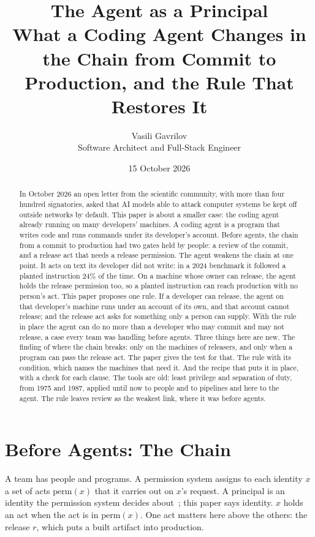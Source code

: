 \documentclass[11pt]{article}
\title{The Agent as a Principal\\
\large What a Coding Agent Changes in the Chain from Commit to Production, and the Rule That Restores It}
\author{Vasili Gavrilov\\Software Architect and Full-Stack Engineer}
\date{15 October 2026}
\theoremstyle{definition}
\begin{document}
\maketitle

\begin{abstract}
In October 2026 an open letter from the scientific community, with more than four hundred signatories, asked that AI models able to attack computer systems be kept off outside networks by default. This paper is about a smaller case: the coding agent already running on many developers' machines. A coding agent is a program that writes code and runs commands under its developer's account. Before agents, the chain from a commit to production had two gates held by people: a review of the commit, and a release act that needs a release permission. The agent weakens the chain at one point. It acts on text its developer did not write: in a 2024 benchmark it followed a planted instruction 24\% of the time. On a machine whose owner can release, the agent holds the release permission too, so a planted instruction can reach production with no person's act. This paper proposes one rule. If a developer can release, the agent on that developer's machine runs under an account of its own, and that account cannot release; and the release act asks for something only a person can supply. With the rule in place the agent can do no more than a developer who may commit and may not release, a case every team was handling before agents. Three things here are new. The finding of where the chain breaks: only on the machines of releasers, and only when a program can pass the release act. The paper gives the test for that. The rule with its condition, which names the machines that need it. And the recipe that puts it in place, with a check for each clause. The tools are old: least privilege and separation of duty, from 1975 and 1987, applied until now to people and to pipelines and here to the agent. The rule leaves review as the weakest link, where it was before agents.
\end{abstract}

\section{Before Agents: The Chain}
\label{sec:before}

A team has people and programs. A permission system assigns to each identity $x$ a set of acts $\mathrm{perm}(x)$ that it carries out on $x$'s request. A principal is an identity the permission system decides about~\cite{Saltzer}; this paper says identity. $x$ holds an act when the act is in $\mathrm{perm}(x)$. One act matters here above the others: the release $r$, which puts a built artifact into production.
\end{document}
